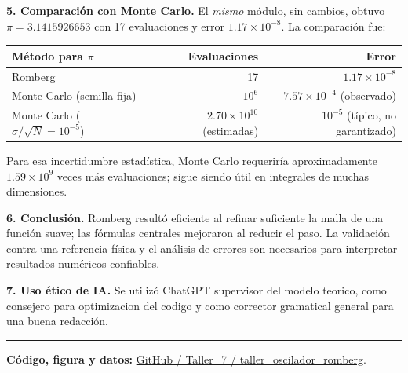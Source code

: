 \documentclass[10pt,a4paper]{article}
\begin{document}
\textbf{5. Comparación con Monte Carlo.}
El \emph{mismo} módulo, sin cambios, obtuvo $\pi=3.1415926653$ con 17 evaluaciones y error $1.17\times10^{-8}$. La comparación fue:
\begin{center}
\vspace{-3pt}
{\small\begin{tabular}{@{}lrr@{}}
\toprule
Método para $\pi$ & Evaluaciones & Error\\
\midrule
Romberg & 17 & $1.17\times10^{-8}$\\
Monte Carlo (semilla fija) & $10^6$ & $7.57\times10^{-4}$ (observado)\\
Monte Carlo ($\sigma/\sqrt{N}=10^{-5}$) & $2.70\times10^{10}$ (estimadas) & $10^{-5}$ (típico, no garantizado)\\
\bottomrule
\end{tabular}}
\vspace{-3pt}
\end{center}
Para esa incertidumbre estadística, Monte Carlo requeriría aproximadamente $1.59\times10^9$ veces más evaluaciones; sigue siendo útil en integrales de muchas dimensiones.

\textbf{6. Conclusión.}
Romberg resultó eficiente al refinar suficiente la malla de una función suave; las fórmulas centrales mejoraron al reducir el paso. La validación contra una referencia física y el análisis de errores son necesarios para interpretar resultados numéricos confiables.

\textbf{7. Uso ético de IA.}
Se utilizó ChatGPT supervisor del modelo teorico, como consejero para optimizacion del codigo y como corrector gramatical general para una buena redacción.

\vspace{3pt}\hrule\vspace{3pt}
{\small\textbf{Código, figura y datos:} \href{https://github.com/cardenascristian-web/fisica-computacional-2026ii/tree/main/Taller_7/taller_oscilador_romberg}{GitHub / Taller\_7 / taller\_oscilador\_romberg}.}
\end{document}
